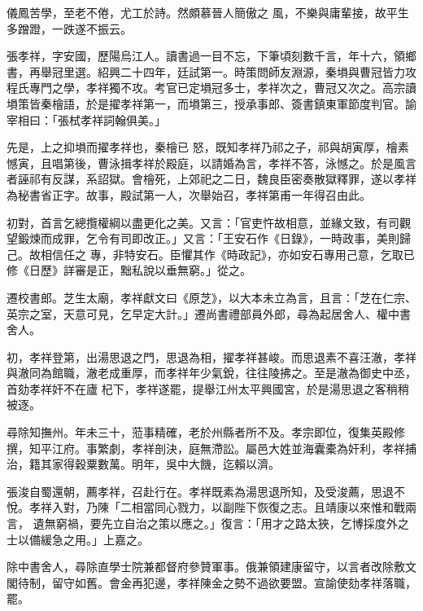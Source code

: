 \begin{pinyinscope}
 儀鳳苦學，至老不倦，尤工於詩。然頗慕晉人簡傲之
 風，不樂與庸輩接，故平生多蹭蹬，一跌遂不振云。



 張孝祥，字安國，歷陽烏江人。讀書過一目不忘，下筆頃刻數千言，年十六，領鄉書，再舉冠里選。紹興二十四年，廷試第一。時策問師友淵源，秦塤與曹冠皆力攻程氏專門之學，孝祥獨不攻。考官已定塤冠多士，孝祥次之，曹冠又次之。高宗讀塤策皆秦檜語，於是擢孝祥第一，而塤第三，授承事郎、簽書鎮東軍節度判官。諭宰相曰：「張栻孝祥詞翰俱美。」



 先是，上之抑塤而擢孝祥也，秦檜已
 怒，既知孝祥乃祁之子，祁與胡寅厚，檜素憾寅，且唱第後，曹泳揖孝祥於殿庭，以請婚為言，孝祥不答，泳憾之。於是風言者誣祁有反謀，系詔獄。會檜死，上郊祀之二日，魏良臣密奏散獄釋罪，遂以孝祥為秘書省正字。故事，殿試第一人，次舉始召，孝祥第甫一年得召由此。



 初對，首言乞總攬權綱以盡更化之美。又言：「官吏忤故相意，並緣文致，有司觀望鍛煉而成罪，乞令有司即改正。」又言：「王安石作《日錄》，一時政事，美則歸己。故相信任之
 專，非特安石。臣懼其作《時政記》，亦如安石專用己意，乞取已修《日歷》詳審是正，黜私說以垂無窮。」從之。



 遷校書郎。芝生太廟，孝祥獻文曰《原芝》，以大本未立為言，且言：「芝在仁宗、英宗之室，天意可見，乞早定大計。」遷尚書禮部員外郎，尋為起居舍人、權中書舍人。



 初，孝祥登第，出湯思退之門，思退為相，擢孝祥甚峻。而思退素不喜汪澈，孝祥與澈同為館職，澈老成重厚，而孝祥年少氣銳，往往陵拂之。至是澈為御史中丞，首劾孝祥奸不在廬
 杞下，孝祥遂罷，提舉江州太平興國宮，於是湯思退之客稍稍被逐。



 尋除知撫州。年未三十，蒞事精確，老於州縣者所不及。孝宗即位，復集英殿修撰，知平江府。事繁劇，孝祥剖決，庭無滯訟。屬邑大姓並海囊橐為奸利，孝祥捕治，籍其家得穀粟數萬。明年，吳中大饑，迄賴以濟。



 張浚自蜀還朝，薦孝祥，召赴行在。孝祥既素為湯思退所知，及受浚薦，思退不悅。孝祥入對，乃陳「二相當同心戮力，以副陛下恢復之志。且靖康以來惟和戰兩言，
 遺無窮禍，要先立自治之策以應之。」復言：「用才之路太狹，乞博採度外之士以備緩急之用。」上嘉之。



 除中書舍人，尋除直學士院兼都督府參贊軍事。俄兼領建康留守，以言者改除敷文閣待制，留守如舊。會金再犯邊，孝祥陳金之勢不過欲要盟。宣諭使劾孝祥落職，罷。




\end{pinyinscope}
